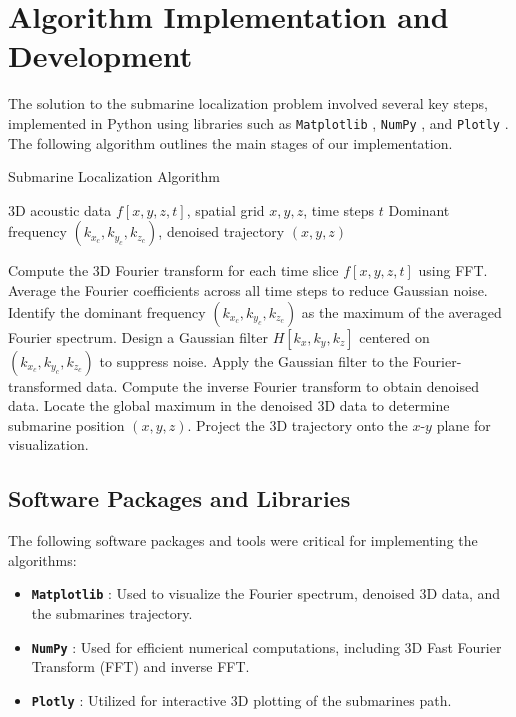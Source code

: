 \documentclass[11pt]{amsart}
\begin{document}
\section{Algorithm Implementation and Development}\label{sec:algorithms}

The solution to the submarine localization problem involved several key steps, implemented in Python using libraries such as \texttt{Matplotlib} \cite{matplotlib}, \texttt{NumPy} \cite{numpy}, and \texttt{Plotly} \cite{plotly}. The following algorithm outlines the main stages of our implementation.

\begin{algorithm}[H]
\caption{Submarine Localization Algorithm}\label{alg:submarine}
\begin{algorithmic}[1]
\Require 3D acoustic data $f[x, y, z, t]$, spatial grid $x, y, z$, time steps $t$
\Ensure Dominant frequency $(k_{x_c}, k_{y_c}, k_{z_c})$, denoised trajectory $(x, y, z)$

\State Compute the 3D Fourier transform for each time slice $f[x, y, z, t]$ using FFT.
\State Average the Fourier coefficients across all time steps to reduce Gaussian noise.
\State Identify the dominant frequency $(k_{x_c}, k_{y_c}, k_{z_c})$ as the maximum of the averaged Fourier spectrum.
\State Design a Gaussian filter $H[k_x, k_y, k_z]$ centered on $(k_{x_c}, k_{y_c}, k_{z_c})$ to suppress noise.
    \State Apply the Gaussian filter to the Fourier-transformed data.
    \State Compute the inverse Fourier transform to obtain denoised data.
    \State Locate the global maximum in the denoised 3D data to determine submarine position $(x, y, z)$.
\EndFor
\State Project the 3D trajectory onto the $x$-$y$ plane for visualization.
\end{algorithmic}
\end{algorithm}

\subsection{Software Packages and Libraries}

The following software packages and tools were critical for implementing the algorithms:
\begin{itemize}
    \item \textbf{\texttt{Matplotlib}} \cite{matplotlib}: Used to visualize the Fourier spectrum, denoised 3D data, and the submarines trajectory.
    \item \textbf{\texttt{NumPy}} \cite{numpy}: Used for efficient numerical computations, including 3D Fast Fourier Transform (FFT) and inverse FFT.
    \item \textbf{\texttt{Plotly}} \cite{plotly}: Utilized for interactive 3D plotting of the submarines path.
\end{itemize}
\end{document}
